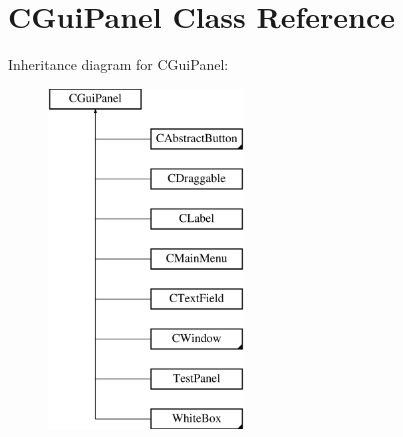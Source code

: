 \hypertarget{class_c_gui_panel}{
\section{CGuiPanel Class Reference}
\label{class_c_gui_panel}
}
Inheritance diagram for CGuiPanel:\begin{figure}[H]
\begin{center}
\leavevmode
\includegraphics[height=9.000000cm]{class_c_gui_panel}
\end{center}
\end{figure}
